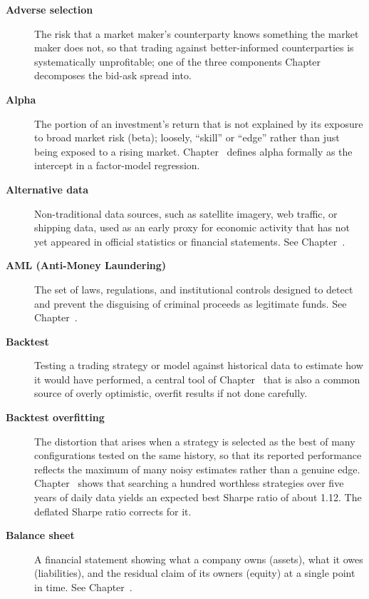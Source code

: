 \documentclass[../ai_in_finance]{subfiles}
\begin{document}
\begin{description}

\item[\textbf{Adverse selection}] The risk that a market maker's counterparty knows something the market maker does not, so that trading against better-informed counterparties is systematically unprofitable; one of the three components Chapter~ decomposes the bid-ask spread into.

\item[\textbf{Alpha}] The portion of an investment's return that is not explained by its exposure to broad market risk (beta); loosely, ``skill'' or ``edge'' rather than just being exposed to a rising market. Chapter~ defines alpha formally as the intercept in a factor-model regression.

\item[\textbf{Alternative data}] Non-traditional data sources, such as satellite imagery, web traffic, or shipping data, used as an early proxy for economic activity that has not yet appeared in official statistics or financial statements. See Chapter~.

\item[\textbf{AML (Anti-Money Laundering)}] The set of laws, regulations, and institutional controls designed to detect and prevent the disguising of criminal proceeds as legitimate funds. See Chapter~.

\item[\textbf{Backtest}] Testing a trading strategy or model against historical data to estimate how it would have performed, a central tool of Chapter~ that is also a common source of overly optimistic, overfit results if not done carefully.

\item[\textbf{Backtest overfitting}] The distortion that arises when a strategy is selected as the best of many configurations tested on the same history, so that its reported performance reflects the maximum of many noisy estimates rather than a genuine edge. Chapter~ shows that searching a hundred worthless strategies over five years of daily data yields an expected best Sharpe ratio of about 1.12. The deflated Sharpe ratio corrects for it.

\item[\textbf{Balance sheet}] A financial statement showing what a company owns (assets), what it owes (liabilities), and the residual claim of its owners (equity) at a single point in time. See Chapter~.


\end{description}
\end{document}
